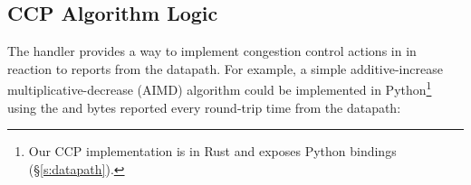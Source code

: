 



\subsection{CCP Algorithm Logic}
\label{s:ccp:ccp_algorithm_logic}
The  handler provides a way to
implement congestion control actions in \userspace in reaction to reports from the datapath.
For example, a simple additive-increase
multiplicative-decrease (AIMD) algorithm could be implemented in Python\footnote{Our CCP implementation is in Rust and exposes Python bindings (\S\ref{s:datapath}).} using
the  and  bytes reported every round-trip time from the datapath:

